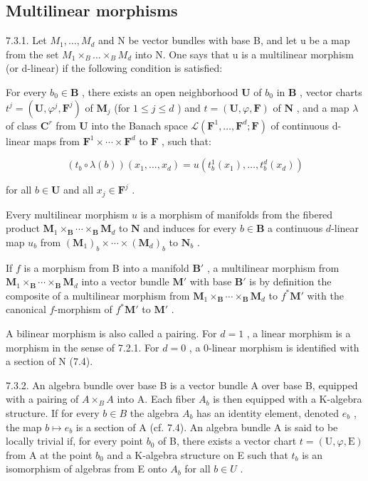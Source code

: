 \subsection{Multilinear morphisms}

7.3.1. Let \(M_{1},\ldots,M_{d}\) and N be vector bundles with base B, and let u be a map from the set \(M_{1}\times_{B}\ldots\times_{B}M_{d}\) into N. One says that u is a multilinear morphism (or d-linear) if the following condition is satisfied:

For every \(b_0 \in \mathbf{B}\) , there exists an open neighborhood \(\mathbf{U}\) of \(b_0\) in \(\mathbf{B}\) , vector charts \(t^j = (\mathbf{U}, \varphi^j, \mathbf{F}^j)\) of \(\mathbf{M}_j\) (for \(1 \leqslant j \leqslant d\) ) and \(t = (\mathbf{U}, \varphi, \mathbf{F})\) of \(\mathbf{N}\) , and a map \(\lambda\) of class \(\mathbf{C}^r\) from \(\mathbf{U}\) into the Banach space \(\mathcal{L}(\mathbf{F}^1, \ldots, \mathbf{F}^d; \mathbf{F})\) of continuous d-linear maps from \(\mathbf{F}^1 \times \cdots \times \mathbf{F}^d\) to \(\mathbf{F}\) , such that:

\[
(t _ {b} \circ \lambda (b)) (x _ {1}, \dots , x _ {d}) = u (t _ {b} ^ {1} (x _ {1}), \dots , t _ {b} ^ {d} (x _ {d}))
\]

for all \(b \in \mathbf{U}\) and all \(x_{j} \in \mathbf{F}^{j}\) .

Every multilinear morphism \(u\) is a morphism of manifolds from the fibered product \(\mathbf{M}_{1} \times_{\mathbf{B}} \cdots \times_{\mathbf{B}} \mathbf{M}_{d}\) to \(\mathbf{N}\) and induces for every \(b \in \mathbf{B}\) a continuous \(d\)-linear map \(u_b\) from \((\mathbf{M}_{1})_{b} \times \cdots \times (\mathbf{M}_{d})_{b}\) to \(\mathbf{N}_{b}\) .

If \(f\) is a morphism from B into a manifold \(\mathbf{B}'\) , a multilinear morphism from \(\mathbf{M}_1 \times_{\mathbf{B}} \cdots \times_{\mathbf{B}} \mathbf{M}_d\) into a vector bundle \(\mathbf{M}'\) with base \(\mathbf{B}'\) is by definition the composite of a multilinear morphism from \(\mathbf{M}_1 \times_{\mathbf{B}} \cdots \times_{\mathbf{B}} \mathbf{M}_d\) to \(f^*\mathbf{M}'\) with the canonical \(f\)-morphism of \(f^*\mathbf{M}'\) to \(\mathbf{M}'\) .

A bilinear morphism is also called a pairing. For \(d=1\) , a linear morphism is a morphism in the sense of 7.2.1. For \(d=0\) , a 0-linear morphism is identified with a section of N (7.4).

7.3.2. An algebra bundle over base B is a vector bundle A over base B, equipped with a pairing of \(A \times_{B} A\) into A. Each fiber \(A_{b}\) is then equipped with a K-algebra structure. If for every \(b \in B\) the algebra \(A_{b}\) has an identity element, denoted \(e_{b}\) , the map \(b \mapsto e_{b}\) is a section of A (cf. 7.4). An algebra bundle A is said to be locally trivial if, for every point \(b_{0}\) of B, there exists a vector chart \(t = (\mathrm{U}, \varphi, \mathrm{E})\) from A at the point \(b_{0}\) and a K-algebra structure on E such that \(t_{b}\) is an isomorphism of algebras from E onto \(A_{b}\) for all \(b \in U\) .

